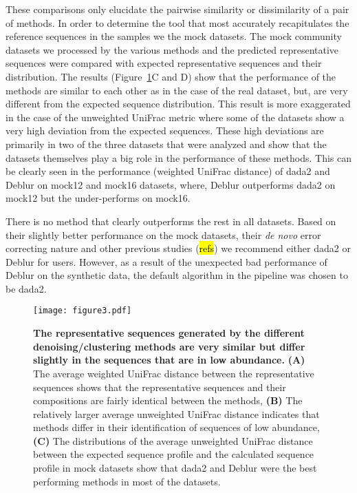   These comparisons only elucidate the pairwise similarity or dissimilarity of a pair of methods.
  In order to determine the tool that most accurately recapitulates the reference sequences in the samples we the mock datasets.
  The mock community datasets we processed by the various methods and the predicted representative sequences were compared with expected representative sequences and their distribution.
  The results (Figure~\ref{fig:figure3}C and D) show that the performance of the methods are similar to each other as in the case of the real dataset, but, are very different from the expected sequence distribution.
  This result is more exaggerated in the case of the unweighted UniFrac metric where some of the datasets show a very high deviation from the expected sequences.
  These high deviations are primarily in two of the three datasets that were analyzed and show that the datasets themselves play a big role in the performance of these methods.
  This can be clearly seen in the performance (weighted UniFrac distance) of \ac{dada2} and Deblur on mock12 and mock16 datasets, where, Deblur outperforms \ac{dada2} on mock12 but the under-performs on mock16.

  There is no method that clearly outperforms the rest in all datasets.
  Based on their slightly better performance on the mock datasets, their \textit{de novo} error correcting nature and other previous studies (\hl{refs}) we recommend either \ac{dada2} or Deblur for users.
  However, as a result of the unexpected bad performance of Deblur on the synthetic data, the default algorithm in the pipeline was chosen to be \ac{dada2}.

  \begin{figure}
    \centering
    \texttt{[image: figure3.pdf]}
    \caption{
      \textbf{The representative sequences generated by the different denoising/clustering methods are very similar but differ slightly in the sequences that are in low abundance.}
      \textbf{(A)} The average weighted UniFrac distance between the representative sequences shows that the representative sequences and their compositions are fairly identical between the methods,
      \textbf{(B)} The relatively larger average unweighted UniFrac distance indicates that methods differ in their identification of sequences of low abundance,
      \textbf{(C)} The distributions of the average unweighted UniFrac distance between the expected sequence profile and the calculated sequence profile in mock datasets show that dada2 and Deblur were the best performing methods in most of the datasets.
    }
    \label{fig:figure3}
  \end{figure}

